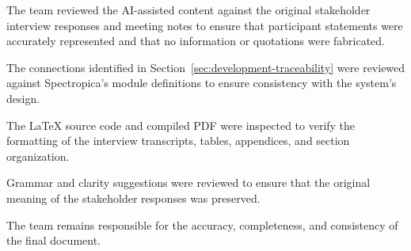 \documentclass[12pt, titlepage]{article}
\begin{document}
The team reviewed the AI-assisted content against the original stakeholder
interview responses and meeting notes to ensure that participant statements
were accurately represented and that no information or quotations were
fabricated.

The connections identified in Section~\ref{sec:development-traceability} were
reviewed against Spectropica's module definitions to ensure consistency with
the system's design.

The \LaTeX{} source code and compiled PDF were inspected to verify the
formatting of the interview transcripts, tables, appendices, and section
organization.

Grammar and clarity suggestions were reviewed to ensure that the original
meaning of the stakeholder responses was preserved.

The team remains responsible for the accuracy, completeness, and consistency
of the final document.
\end{document}
